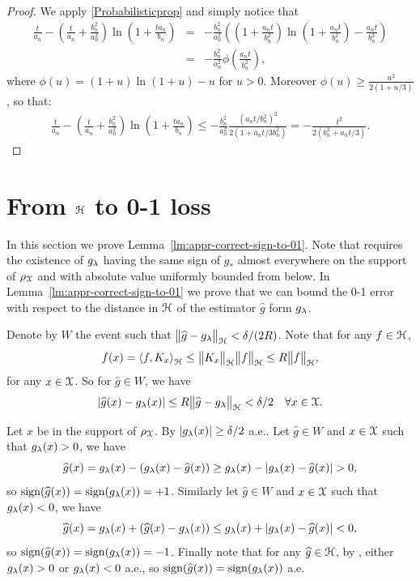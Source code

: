 \begin{proof}
We apply \ref{Probabilisticprop} and simply notice that 
\begin{eqnarray*}
\frac{t}{a_n} - \left(\frac{t}{a_n} + \frac{b_n^2}{a_n^2}\right)\ln \left( 1+ \frac{t a_n}{b_n} \right) &=& -\frac{b_n^2}{a_n^2}\left(\left(1+\frac{a_n t}{b_n^2}\right)\ln\left(1+ \frac{a_n t}{b_n^2}\right)  -\frac{a_n t}{b_n^2}\right) \\
&=& -\frac{b_n^2}{a_n^2}\phi\left(\frac{a_n t}{b_n^2}\right),
\end{eqnarray*}
where $\phi(u) = (1+u) \ln (1+u) - u$ for $u > 0$. Moreover $\phi (u) \geqslant\displaystyle \frac{u^2}{2\left( 1+u/3 \right)}$, so that:
\begin{eqnarray*}
\frac{t}{a_n} - \left(\frac{t}{a_n} + \frac{b_n^2}{a_n^2}\right)\ln \left( 1+ \frac{t a_n}{b_n} \right) \leqslant -\frac{b_n^2}{a_n^2}\frac{(a_n t/b_n^2)^2}{2\left( 1+a_n t/3b_n^2 \right)} = -\frac{t^2}{2\left( b_n^2+a_n t/3 \right)}.
\end{eqnarray*}
\end{proof}



\section{From \texorpdfstring{${\mathcal H}$}{H} to 0-1 loss}\label{sect:proof-A5-to-01}

In this section we prove Lemma~\ref{lm:appr-correct-sign-to-01}. Note that  requires the existence of $g_\lambda$ having the same sign of $g_\ast$ almost everywhere on the support of ${\rho_{{\mathcal X}}}$ and with absolute value uniformly bounded from below. In Lemma~\ref{lm:appr-correct-sign-to-01} we prove that we can bound the 0-1 error with respect to the distance in $\mathcal H$ of the estimator $\widehat{g}$ form $g_\lambda$. 

Denote by $W$ the event such that $\bigl\|{\widehat{g} - g_\lambda}\bigr\|_\mathcal H < \delta/(2R)$. Note that for any $f \in \mathcal H$, 
$$f(x) = \left\langle{f},{K_x}\right\rangle_\mathcal H \leq \bigl\|{K_x}\bigr\|_\mathcal H \bigl\|{f}\bigr\|_\mathcal H \leq R \bigl\|{f}\bigr\|_\mathcal H,$$
for any $x \in {\mathcal X}$. So for $\widehat{g} \in W$, we have
$$ |\widehat{g}(x) - g_\lambda(x)| \leq R \bigl\|{\widehat{g}-g_\lambda}\bigr\|_\mathcal H  < \delta/2 \quad \forall x \in {\mathcal X}.$$


Let $x$ be in the support of ${\rho_{{\mathcal X}}}$. By  $|g_\lambda(x)| \geq \delta/2$ a.e.. Let $\widehat{g} \in W$ and $x \in {\mathcal X}$ such that $g_\lambda(x) > 0$, we have
$$\widehat{g}(x) = g_\lambda(x) - (g_\lambda(x) - \widehat{g}(x)) \geq g_\lambda(x) - |g_\lambda(x) - \widehat{g}(x)| > 0,$$
so $\mathop{ \mathrm{sign}}(\widehat{g}(x)) = \mathop{ \mathrm{sign}}(g_\lambda(x)) = +1$. Similarly let $\widehat{g} \in W$ and $x \in {\mathcal X}$ such that $g_\lambda(x) < 0$, we have
$$\widehat{g}(x) = g_\lambda(x) + ( \widehat{g}(x) - g_\lambda(x)) \leq g_\lambda(x) + |g_\lambda(x) - \widehat{g}(x)| < 0,$$
so $\mathop{ \mathrm{sign}}(\widehat{g}(x)) = \mathop{ \mathrm{sign}}(g_\lambda(x)) = -1$. Finally note that for any $\widehat{g} \in \mathcal H$, by , either $g_\lambda(x) > 0$ or $g_\lambda(x) < 0$ a.e., so $\mathop{ \mathrm{sign}}(\widehat{g}(x)) = \mathop{ \mathrm{sign}}(g_\lambda(x))$ a.e.

